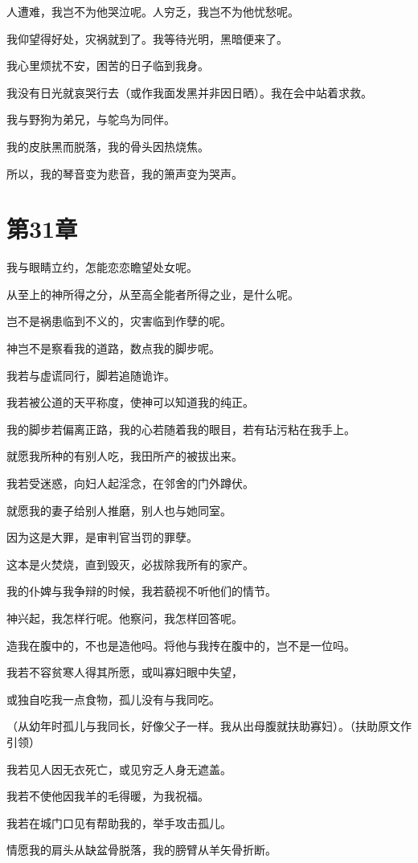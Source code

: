 \documentclass[12pt,oneside]{book}
\begin{document}
人遭难，我岂不为他哭泣呢。人穷乏，我岂不为他忧愁呢。

我仰望得好处，灾祸就到了。我等待光明，黑暗便来了。

我心里烦扰不安，困苦的日子临到我身。

我没有日光就哀哭行去（或作我面发黑并非因日晒）。我在会中站着求救。

我与野狗为弟兄，与鸵鸟为同伴。

我的皮肤黑而脱落，我的骨头因热烧焦。

所以，我的琴音变为悲音，我的箫声变为哭声。


\chapter{第31章}
我与眼睛立约，怎能恋恋瞻望处女呢。

从至上的神所得之分，从至高全能者所得之业，是什么呢。

岂不是祸患临到不义的，灾害临到作孽的呢。

神岂不是察看我的道路，数点我的脚步呢。

我若与虚谎同行，脚若追随诡诈。

我若被公道的天平称度，使神可以知道我的纯正。

我的脚步若偏离正路，我的心若随着我的眼目，若有玷污粘在我手上。

就愿我所种的有别人吃，我田所产的被拔出来。

我若受迷惑，向妇人起淫念，在邻舍的门外蹲伏。

就愿我的妻子给别人推磨，别人也与她同室。

因为这是大罪，是审判官当罚的罪孽。

这本是火焚烧，直到毁灭，必拔除我所有的家产。

我的仆婢与我争辩的时候，我若藐视不听他们的情节。

神兴起，我怎样行呢。他察问，我怎样回答呢。

造我在腹中的，不也是造他吗。将他与我抟在腹中的，岂不是一位吗。

我若不容贫寒人得其所愿，或叫寡妇眼中失望，

或独自吃我一点食物，孤儿没有与我同吃。

（从幼年时孤儿与我同长，好像父子一样。我从出母腹就扶助寡妇）。（扶助原文作引领）

我若见人因无衣死亡，或见穷乏人身无遮盖。

我若不使他因我羊的毛得暖，为我祝福。

我若在城门口见有帮助我的，举手攻击孤儿。

情愿我的肩头从缺盆骨脱落，我的膀臂从羊矢骨折断。
\end{document}
